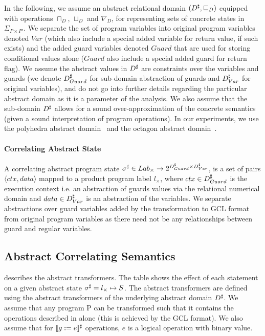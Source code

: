 In the following, we assume an abstract relational domain $(D^\sharp, \sqsubseteq_{D})$ equipped with operations $\sqcap_{D}$, $\sqcup_{D}$ and $\nabla_{D}$, for representing sets of concrete states in $\Sigma_{P \times P'}$. We separate the set of program variables into original program variables denoted $Var$ (which also include a special added variable for return value, if such exists) and the added guard variables denoted $Guard$ that are used for storing conditional values alone ($Guard$ also include a special added guard for return flag). We assume the abstract values in $D^\sharp$ are constraints over the variables and guards (we denote $D^\sharp_{Guard}$ for sub-domain abstraction of guards and $D^\sharp_{Var}$ for original variables), and do not go into further details regarding the particular abstract domain as it is a parameter of the analysis. We also assume that the sub-domain $D^\sharp$ allows for a sound over-approximation of the concrete semantics (given a sound interpretation of program operations). In our experiments, we use the polyhedra abstract domain~\cite{CousotHalbwachs78} and the octagon abstract domain~\cite{Mine07}.

\paragraph{Correlating Abstract State} 
A correlating abstract program state $\sigma^\sharp \in Lab_{\times} \rightarrow 2^{D^\sharp_{Guard} \times D^\sharp_{Var}}$, is a set of pairs $\langle ctx, data \rangle$ mapped to a product program label $l_{\times}$, where $ctx \in D^\sharp_{Guard}$ is the execution context i.e. an abstraction of guards values via the relational numerical domain and $data \in D^\sharp_{Var}$ is an abstraction of the variables. We separate abstractions over guard variables added by the transformation to GCL format from original program variables as there need not be any relationships between guard and regular variables.

\subsection{Abstract Correlating Semantics}



 describes the abstract transformers. The table shows the effect of each statement on a given abstract state $\sigma^\sharp = l_{\times} \mapsto S$. The abstract transformers are defined using the abstract transformers of the underlying abstract domain $D^\sharp$. We assume that any program P can be transformed such that it contains the operations described in  alone (this is achieved by the GCL format). We also assume that for $\lbrack\!\lbrack g:=e \rbrack\!\rbrack^{\sharp}$ operations, $e$ is a logical operation with binary value.

